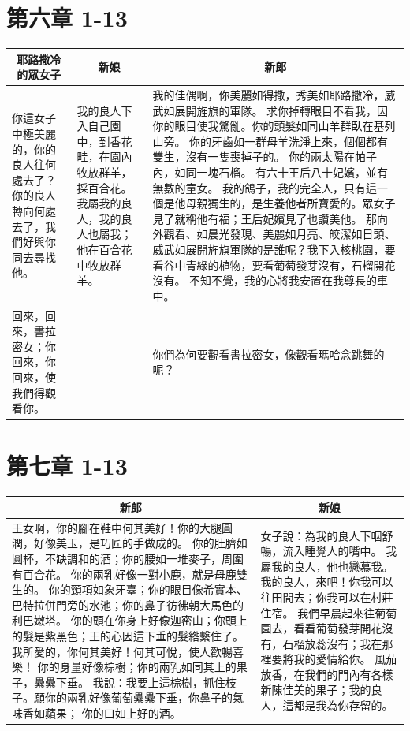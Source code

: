 \section{第六章     1-13}
\begin{table}[H]
\centering
\begin{tabular}{p{4.5cm}|p{2.0cm}|p{10.50cm}}\hline\hline
\multicolumn{1}{c|}{耶路撒冷的眾女子}&\multicolumn{1}{c|}{新娘}&\multicolumn{1}{c}{新郎}\\\hline
你這女子中極美麗的，你的良人往何處去了？你的良人轉向何處去了，我們好與你同去尋找他。
&我的良人下入自己園中，到香花畦，在園內牧放群羊，採百合花。
我屬我的良人，我的良人也屬我；他在百合花中牧放群羊。
&我的佳偶啊，你美麗如得撒，秀美如耶路撒冷，威武如展開旌旗的軍隊。
求你掉轉眼目不看我，因你的眼目使我驚亂。你的頭髮如同山羊群臥在基列山旁。
你的牙齒如一群母羊洗淨上來，個個都有雙生，沒有一隻喪掉子的。
你的兩太陽在帕子內，如同一塊石榴。
有六十王后八十妃嬪，並有無數的童女。
我的鴿子，我的完全人，只有這一個是他母親獨生的，是生養他者所寶愛的。眾女子見了就稱他有福；王后妃嬪見了也讚美他。
那向外觀看、如晨光發現、美麗如月亮、皎潔如日頭、威武如展開旌旗軍隊的是誰呢？我下入核桃園，要看谷中青綠的植物，要看葡萄發芽沒有，石榴開花沒有。
不知不覺，我的心將我安置在我尊長的車中。\\\hline
回來，回來，書拉密女；你回來，你回來，使我們得觀看你。&&你們為何要觀看書拉密女，像觀看瑪哈念跳舞的呢？\\\hline
\end{tabular}
\end{table}



\section{第七章     1-13}
\begin{table}[H]
\centering
\begin{tabular}{p{12.5cm}|p{5.0cm}}\hline\hline
\multicolumn{1}{c|}{新郎}&\multicolumn{1}{c}{新娘}\\\hline
王女啊，你的腳在鞋中何其美好！你的大腿圓潤，好像美玉，是巧匠的手做成的。
你的肚臍如圓杯，不缺調和的酒；你的腰如一堆麥子，周圍有百合花。
你的兩乳好像一對小鹿，就是母鹿雙生的。
你的頸項如象牙臺；你的眼目像希實本、巴特拉併門旁的水池；你的鼻子彷彿朝大馬色的利巴嫩塔。
你的頭在你身上好像迦密山；你頭上的髮是紫黑色；王的心因這下垂的髮綹繫住了。
我所愛的，你何其美好！何其可悅，使人歡暢喜樂！
你的身量好像棕樹；你的兩乳如同其上的果子，纍纍下垂。
我說：我要上這棕樹，抓住枝子。願你的兩乳好像葡萄纍纍下垂，你鼻子的氣味香如蘋果；
你的口如上好的酒。&女子說：為我的良人下咽舒暢，流入睡覺人的嘴中。
我屬我的良人，他也戀慕我。
我的良人，來吧！你我可以往田間去；你我可以在村莊住宿。
我們早晨起來往葡萄園去，看看葡萄發芽開花沒有，石榴放蕊沒有；我在那裡要將我的愛情給你。
風茄放香，在我們的門內有各樣新陳佳美的果子；我的良人，這都是我為你存留的。\\\hline
\end{tabular}
\end{table}


